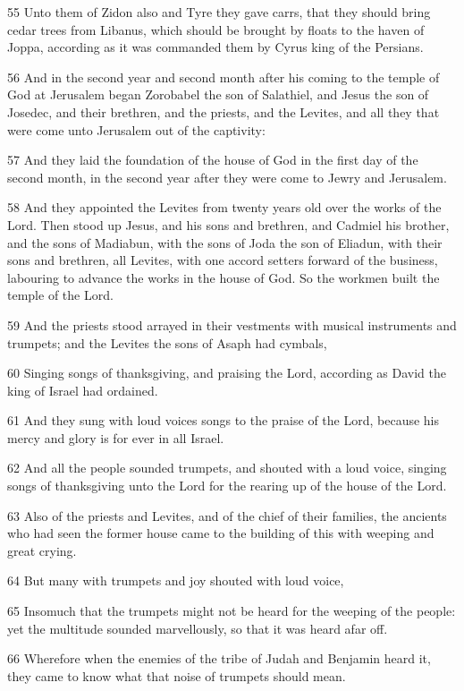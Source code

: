 \par 55 Unto them of Zidon also and Tyre they gave carrs, that they should bring cedar trees from Libanus, which should be brought by floats to the haven of Joppa, according as it was commanded them by Cyrus king of the Persians.
\par 56 And in the second year and second month after his coming to the temple of God at Jerusalem began Zorobabel the son of Salathiel, and Jesus the son of Josedec, and their brethren, and the priests, and the Levites, and all they that were come unto Jerusalem out of the captivity:
\par 57 And they laid the foundation of the house of God in the first day of the second month, in the second year after they were come to Jewry and Jerusalem.
\par 58 And they appointed the Levites from twenty years old over the works of the Lord. Then stood up Jesus, and his sons and brethren, and Cadmiel his brother, and the sons of Madiabun, with the sons of Joda the son of Eliadun, with their sons and brethren, all Levites, with one accord setters forward of the business, labouring to advance the works in the house of God. So the workmen built the temple of the Lord.
\par 59 And the priests stood arrayed in their vestments with musical instruments and trumpets; and the Levites the sons of Asaph had cymbals,
\par 60 Singing songs of thanksgiving, and praising the Lord, according as David the king of Israel had ordained.
\par 61 And they sung with loud voices songs to the praise of the Lord, because his mercy and glory is for ever in all Israel.
\par 62 And all the people sounded trumpets, and shouted with a loud voice, singing songs of thanksgiving unto the Lord for the rearing up of the house of the Lord.
\par 63 Also of the priests and Levites, and of the chief of their families, the ancients who had seen the former house came to the building of this with weeping and great crying.
\par 64 But many with trumpets and joy shouted with loud voice,
\par 65 Insomuch that the trumpets might not be heard for the weeping of the people: yet the multitude sounded marvellously, so that it was heard afar off.
\par 66 Wherefore when the enemies of the tribe of Judah and Benjamin heard it, they came to know what that noise of trumpets should mean.
